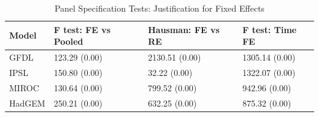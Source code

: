 \begin{table}[ht]
\centering
\caption{Panel Specification Tests: Justification for Fixed Effects} 
\label{tab:panel_spec_tests}
\begin{tabular}{llll}
  \hline
Model & F test: FE vs Pooled & Hausman: FE vs RE & F test: Time FE \\ 
  \hline
GFDL & 123.29 (0.00) & 2130.51 (0.00) & 1305.14 (0.00) \\ 
  IPSL & 150.80 (0.00) & 32.22 (0.00) & 1322.07 (0.00) \\ 
  MIROC & 130.64 (0.00) & 799.52 (0.00) & 942.96 (0.00) \\ 
  HadGEM & 250.21 (0.00) & 632.25 (0.00) & 875.32 (0.00) \\ 
   \hline
\end{tabular}
\end{table}

